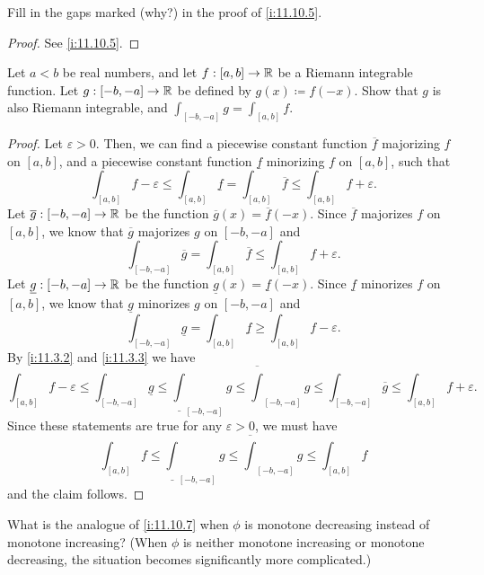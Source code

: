 \begin{ex}\label{i:ex:11.10.2}
  Fill in the gaps marked (why?) in the proof of \cref{i:11.10.5}.
\end{ex}

\begin{proof}
  See \cref{i:11.10.5}.
\end{proof}

\begin{ex}\label{i:ex:11.10.3}
  Let \(a < b\) be real numbers, and let \(f : [a, b] \to \mathbb{R}\) be a Riemann integrable function.
  Let \(g : [-b, -a] \to \mathbb{R}\) be defined by \(g(x) \coloneqq f(-x)\).
  Show that \(g\) is also Riemann integrable, and \(\int_{[-b, -a]} g = \int_{[a, b]} f\).
\end{ex}

\begin{proof}
  Let \(\varepsilon > 0\).
  Then, we can find a piecewise constant function \(\overline{f}\) majorizing \(f\) on \([a, b]\), and a piecewise constant function \(\underline{f}\) minorizing \(f\) on \([a, b]\), such that
  \[
    \int_{[a, b]} f - \varepsilon \leq \int_{[a, b]} \underline{f} = \int_{[a, b]} \overline{f} \leq \int_{[a, b]} f + \varepsilon.
  \]
  Let \(\overline{g} : [-b, -a] \to \mathbb{R}\) be the function \(\overline{g}(x) = \overline{f}(-x)\).
  Since \(\overline{f}\) majorizes \(f\) on \([a, b]\), we know that \(\overline{g}\) majorizes \(g\) on \([-b, -a]\) and
  \[
    \int_{[-b, -a]} \overline{g} = \int_{[a, b]} \overline{f} \leq \int_{[a, b]} f + \varepsilon.
  \]
  Let \(\underline{g} : [-b, -a] \to \mathbb{R}\) be the function \(\underline{g}(x) = \underline{f}(-x)\).
  Since \(\underline{f}\) minorizes \(f\) on \([a, b]\), we know that \(\underline{g}\) minorizes \(g\) on \([-b, -a]\) and
  \[
    \int_{[-b, -a]} \underline{g} = \int_{[a, b]} \underline{f} \geq \int_{[a, b]} f - \varepsilon.
  \]
  By \cref{i:11.3.2} and \cref{i:11.3.3} we have
  \[
    \int_{[a, b]} f - \varepsilon \leq \int_{[-b, -a]} \underline{g} \leq \underline{\int}_{[-b, -a]} g \leq \overline{\int}_{[-b, -a]} g \leq \int_{[-b, -a]} \overline{g} \leq \int_{[a, b]} f + \varepsilon.
  \]
  Since these statements are true for any \(\varepsilon > 0\), we must have
  \[
    \int_{[a, b]} f \leq \underline{\int}_{[-b, -a]} g \leq \overline{\int}_{[-b, -a]} g \leq \int_{[a, b]} f
  \]
  and the claim follows.
\end{proof}

\begin{ex}\label{i:ex:11.10.4}
  What is the analogue of \cref{i:11.10.7} when \(\phi\) is monotone decreasing instead of monotone increasing?
  (When \(\phi\) is neither monotone increasing or monotone decreasing, the situation becomes significantly more complicated.)
\end{ex}

